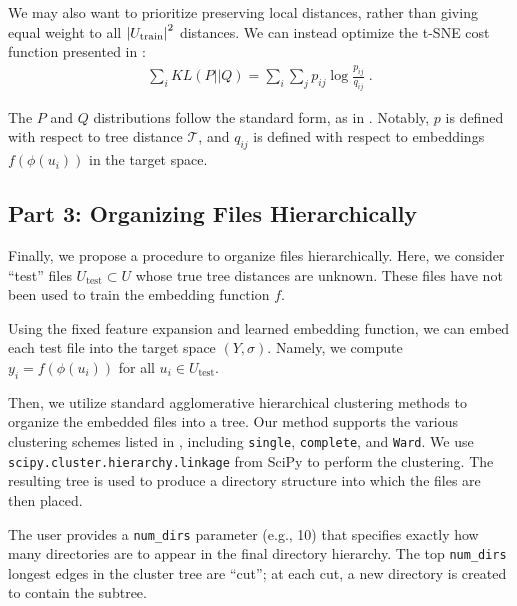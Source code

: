 \documentclass{article}
\begin{document}
We may also want to prioritize preserving local distances, rather than giving equal weight to all $\abs{U_\text{train}}^2$ distances. We can instead optimize the t-SNE cost function presented in \cite{maaten2008visualizing}:
\begin{align}
  \sum_i KL(P||Q) = \sum_i \sum_j p_{ij} \log \frac{p_{ij}}{q_{ij}} \; .
  \label{eq:tsne-cost}
\end{align}

The $P$ and $Q$ distributions follow the standard form, as in \cite{maaten2008visualizing}. Notably, $p$ is defined with respect to tree distance $\mathcal T$, and $q_{ij}$ is defined with respect to embeddings $f(\phi(u_i))$ in the target space.

\subsection{Part 3: Organizing Files Hierarchically}

Finally, we propose a procedure to organize files hierarchically. Here, we consider ``test'' files $U_\text{test} \subset U$ whose true tree distances are unknown. These files have not been used to train the embedding function $f$.

Using the fixed feature expansion and learned embedding function, we can embed each test file into the target space $(Y, \sigma)$. Namely, we compute $y_i = f(\phi(u_i))$ for all $u_i \in U_\text{test}$.

Then, we utilize standard agglomerative hierarchical clustering methods to organize the embedded files into a tree. Our method supports the various clustering schemes listed in \cite{müllner2011modernhierarchicalagglomerativeclustering}, including \texttt{single}, \texttt{complete}, and \texttt{Ward}. We use \texttt{scipy.cluster.hierarchy.linkage} from SciPy to perform the clustering. The resulting tree is used to produce a directory structure into which the files are then placed.

The user provides a \texttt{num\_dirs} parameter (e.g., 10) that specifies exactly how many directories are to appear in the final directory hierarchy. The top \texttt{num\_dirs} longest edges in the cluster tree are ``cut''; at each cut, a new directory is created to contain the subtree.
\end{document}
